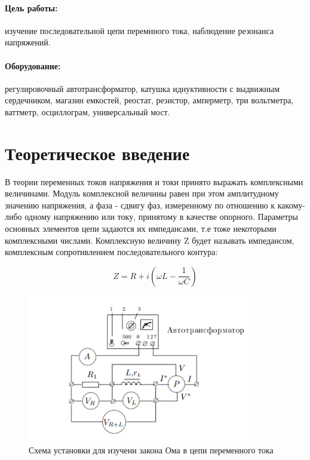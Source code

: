 





\paragraph*{Цель работы:} изучение последовательной цепи перемнного тока, наблюдение резонанса напряжений.
\paragraph*{Оборудование:} регулировочный автотрансформатор, катушка иднуктивности с выдвижным сердечником, магазин емкостей, реостат, резистор, амперметр, три вольтметра, ваттметр, осциллограм, универсальный мост.



\section{Теоретическое введение}

В теории переменных токов напряжения и токи принято выражать комплексными величинами. Модуль комплексной величины равен при этом амплитудному значению напряжения, а фаза - сдвигу фаз, измеренному по отношению к какому-либо одному напряжению или току, принятому в качестве опорного. Параметры основных элементов цепи задаются их импедансами, т.е тоже некоторыми комплексными числами.
\newline
Комплексную величину Z будет называть импедансом, комплексным сопротивлением последовательного контура:

\begin{equation}\label{}
Z = R + i(\omega L - \frac{1}{\omega C})
\end{equation}

\begin{figure}[h]
	\includegraphics[width= 10cm]{pics/Pic1.png}
	\caption{Схема установки для изучени закона Ома в цепи переменного тока}
	\label{Pic1}
\end{figure}

